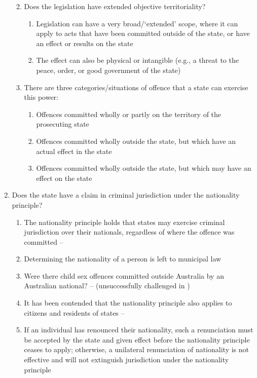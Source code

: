 \begin{enumerate}
\begin{enumerate}
\begin{enumerate}
        \end{enumerate}
        \item Does the legislation have extended objective territoriality?
        \begin{enumerate}
            \item Legislation can have a very broad/`extended' scope, where it can apply to acts that have been committed outside of the state, or have an effect or results on the state
            \item The effect can also be physical or intangible (e.g., a threat to the peace, order, or good government of the state)
        \end{enumerate}
        \item There are three categories/situations of offence that a state can exercise this power:
        \begin{enumerate}
            \item Offences committed wholly or partly on the territory of the prosecuting state
            \item Offences committed wholly outside the state, but which have an actual effect in the state
            \item Offences committed wholly outside the state, but which may have an effect on the state
        \end{enumerate}
    \end{enumerate}
    \item Does the state have a claim in criminal jurisdiction under the nationality principle?
    \begin{enumerate}
        \item The nationality principle holds that states may exercise criminal jurisdiction over their nationals, regardless of where the offence was committed -- 
        \item Determining the nationality of a person is left to municipal law
        \item Were there child sex offences committed outside Australia by an Australian national? --  (unsuccessfully challenged in )
        \item It has been contended that the nationality principle also applies to citizens and residents of states -- 
        \item If an individual has renounced their nationality, such a renunciation must be accepted by the state and given effect before the nationality principle ceases to apply; otherwise, a unilateral renunciation of nationality is not effective and will not extinguish jurisdiction under the nationality principle

\end{enumerate}
\end{enumerate}
